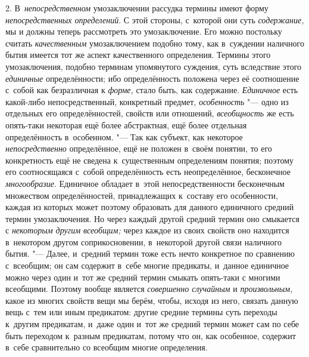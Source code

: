 2. В~{\em непосредственном}
умозаключении рассудка термины имеют форму
{\em непосредственных определений}.
С этой стороны, с~которой они суть
{\em содержание,} мы и
должны теперь рассмотреть это умозаключение. Его можно постольку считать
{\em качественным}
умозаключением подобно тому, как в~суждении наличного бытия
имеется тот же аспект качественного определения. Термины этого
умозаключения, подобно терминам упомянутого суждения, суть вследствие этого
{\em единичные}
определённости; ибо определённость положена через её
соотношение с~собой как безразличная к
{\em форме,} стало быть,
как содержание. {\em Единичное}
есть какой-либо непосредственный, конкретный предмет,
{\em особенность} "--- одно
из отдельных его определённостей, свойств или отношений,
{\em всеобщность} же есть
опять-таки некоторая ещё более абстрактная, ещё более отдельная
определённость в~особенном. "--- Так как субъект, как некоторое
{\em непосредственно}
определённое, ещё не положен в~своём понятии, то его
конкретность ещё не сведена к~существенным определениям понятия; поэтому
его соотносящаяся с~собой определённость есть
неопределённое, бесконечное
{\em многообразие}.
Единичное обладает в~этой непосредственности бесконечным
множеством определённостей, принадлежащих к~составу его особенности, каждая
из которых может поэтому образовать для данного единичного средний термин
умозаключения. Но через каждый другой средний термин оно смыкается с
{\em некоторым другим всеобщим;}
через каждое из своих свойств оно находится в~некотором
другом соприкосновении, в~некоторой другой связи наличного бытия. "---
Далее, и~средний термин тоже есть нечто конкретное по
сравнению с~всеобщим; он сам содержит в~себе многие предикаты, и~данное
единичное можно через один и~тот же средний термин смыкать опять-таки с
многими всеобщими. Поэтому вообще является
{\em совершенно случайным}
и {\em произвольным,}
какое из многих свойств вещи мы берём, чтобы, исходя из него,
связать данную вещь с~тем или иным предикатом: другие средние термины суть
переходы к~другим предикатам, и~даже один и~тот же средний термин может сам
по себе быть переходом к~разным предикатам, потому что он, как особенное,
содержит в~себе сравнительно со всеобщим многие определения.


